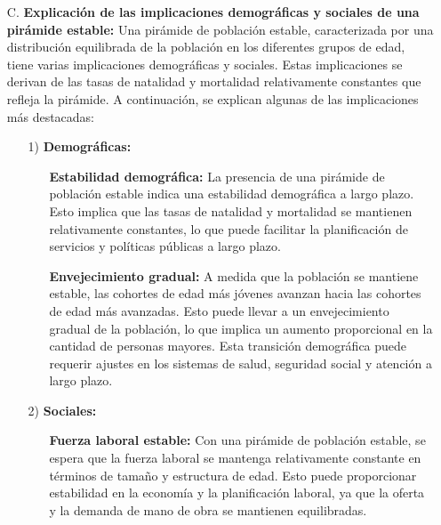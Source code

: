 \documentclass[8pt,a4paper]{beamer}
\begin{document}
{\begin{frame}{}
\begin{block}{}
\justifying
\begin{enumerate}
\justifying
\item[C.] \textbf{Explicación de las implicaciones demográficas y sociales de una pirámide estable:} Una pirámide de población estable, caracterizada por una distribución equilibrada de la población en los diferentes grupos de edad, tiene varias implicaciones demográficas y sociales. Estas implicaciones se derivan de las tasas de natalidad y mortalidad relativamente constantes que refleja la pirámide. A continuación, se explican algunas de las implicaciones más destacadas:
\begin{enumerate}
\justifying
\item[1)] \textbf{Demográficas:} 
\begin{itemize}
\justifying
\item[\ding{65}] \textbf{Estabilidad demográfica:} La presencia de una pirámide de población estable indica una estabilidad demográfica a largo plazo. Esto implica que las tasas de natalidad y mortalidad se mantienen relativamente constantes, lo que puede facilitar la planificación de servicios y políticas públicas a largo plazo.

\item[\ding{65}] \textbf{Envejecimiento gradual:} A medida que la población se mantiene estable, las cohortes de edad más jóvenes avanzan hacia las cohortes de edad más avanzadas. Esto puede llevar a un envejecimiento gradual de la población, lo que implica un aumento proporcional en la cantidad de personas mayores. Esta transición demográfica puede requerir ajustes en los sistemas de salud, seguridad social y atención a largo plazo.
\end{itemize}
\item[2)] \textbf{Sociales:} 
\begin{itemize}
\justifying
\item[\ding{65}] \textbf{Fuerza laboral estable:} Con una pirámide de población estable, se espera que la fuerza laboral se mantenga relativamente constante en términos de tamaño y estructura de edad. Esto puede proporcionar estabilidad en la economía y la planificación laboral, ya que la oferta y la demanda de mano de obra se mantienen equilibradas.
\end{itemize}
\end{enumerate}
\end{enumerate}
\end{block}
\end{frame}


}
\end{document}
